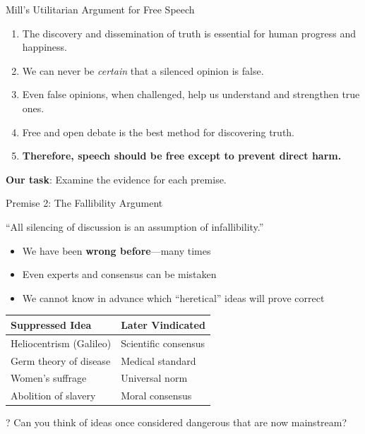 ﻿\documentclass[aspectratio=169]{beamer}
\begin{document}
\begin{frame}{Mill's Utilitarian Argument for Free Speech}
\begin{argumentbox}
\begin{enumerate}
    \item The discovery and dissemination of truth is essential for human progress and happiness.
    \item We can never be \textit{certain} that a silenced opinion is false.
    \item Even false opinions, when challenged, help us understand and strengthen true ones.
    \item Free and open debate is the best method for discovering truth.
    \item[\textbf{C.}] \textbf{Therefore, speech should be free except to prevent direct harm.}
\end{enumerate}
\end{argumentbox}

\vspace{0.3cm}
\textbf{Our task}: Examine the evidence for each premise.
\end{frame}

\begin{frame}{Premise 2: The Fallibility Argument}
\begin{quotebox}[Mill]
``All silencing of discussion is an assumption of infallibility.''
\end{quotebox}

\vspace{0.2cm}
\begin{itemize}
    \item We have been \textbf{wrong before}---many times
    \item Even experts and consensus can be mistaken
    \item We cannot know in advance which ``heretical'' ideas will prove correct
\end{itemize}

\vspace{0.2cm}
\begin{table}[h]
\centering
\small
\begin{tabular}{l l}
\toprule
\textbf{Suppressed Idea} & \textbf{Later Vindicated} \\
\midrule
Heliocentrism (Galileo) & Scientific consensus \\
Germ theory of disease & Medical standard \\
Women's suffrage & Universal norm \\
Abolition of slavery & Moral consensus \\
\bottomrule
\end{tabular}
\end{table}

\begin{alertblock}{?}
Can you think of ideas once considered dangerous that are now mainstream?
\end{alertblock}
\end{frame}
\end{document}
